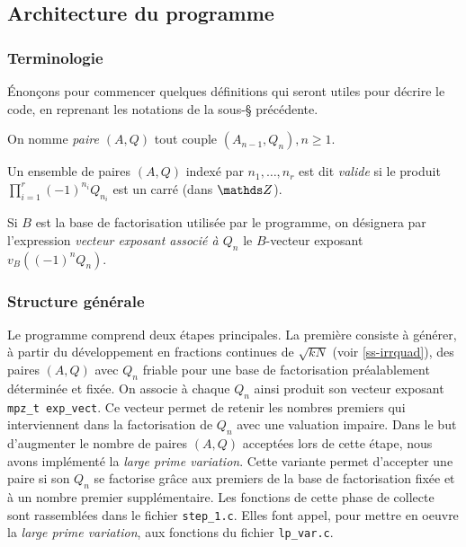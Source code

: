 \subsection{Architecture du programme}

\subsubsection{Terminologie}

Énonçons pour commencer quelques définitions qui seront utiles pour décrire le
code, en reprenant les notations de la sous-§ précédente.

\begin{definition}
	On nomme \emph{paire $(A, Q)$} tout couple $(A_{n-1}, Q_n), n\geq 1$.
\end{definition}

\begin{definition}
	Un ensemble de paires $(A, Q)$ indexé par $n_1, \dots, n_r$ est dit
	\emph{valide} si le produit $\prod_{i=1}^r (-1)^{n_i} Q_{n_i}$ est un carré
	(dans $\Z$).
\end{definition}

\begin{definition}
    Si $B$ est la base de factorisation utilisée par le programme, on 
    désignera par l'expression \emph{vecteur exposant associé à $Q_n$} 
    le $B$-vecteur exposant $v_B((-1)^n Q_n)$.
\end{definition}

\subsubsection{Structure générale}

Le programme comprend deux étapes principales. La première consiste à générer,
à partir du développement en fractions continues de $\sqrt{kN}$ (voir
\ref{ss-irrquad}), des paires $(A, Q)$ avec $Q_n$ friable pour une base de
factorisation préalablement déterminée et fixée. On associe à chaque $Q_n$
ainsi produit son vecteur exposant \texttt{mpz\_t exp\_vect}. Ce vecteur permet
de retenir les nombres premiers qui interviennent dans la factorisation de
$Q_n$ avec une valuation impaire. Dans le but d'augmenter le nombre de paires
$(A,Q)$ acceptées lors de cette étape, nous avons implémenté la \textit{large
prime variation}. Cette variante permet d'accepter une paire si son $Q_n$ se
factorise grâce aux premiers de la base de factorisation fixée et à un nombre
premier supplémentaire. Les fonctions de cette phase de collecte sont
rassemblées dans le fichier \texttt{step\_1.c}. Elles font appel, pour mettre
en oeuvre la \textit{large prime variation}, aux fonctions du fichier
\texttt{lp\_var.c}. \\
 
